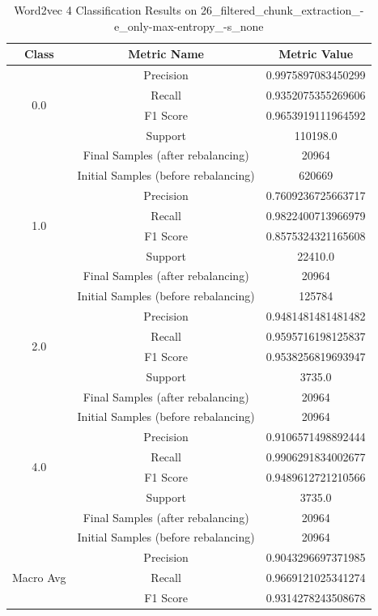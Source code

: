 \begin{longtable}{|c|c|c|}
\caption{Word2vec 4 Classification Results on 26\_filtered\_chunk\_extraction\_-e\_only-max-entropy\_-s\_none} \label{tab:26_filtered_chunk_extraction_-e_only-max-entropy_-s_none_word2vec_4_classifiers_results} \\
\hline
Class & Metric Name & Metric Value \\
\hline
\multirow{4}{*}{0.0} & Precision & 0.9975897083450299 \\
 & Recall & 0.9352075355269606 \\
 & F1 Score & 0.9653919111964592 \\
 & Support & 110198.0 \\
 & Final Samples (after rebalancing) & 20964 \\
 & Initial Samples (before rebalancing) & 620669 \\
\hline
\multirow{4}{*}{1.0} & Precision & 0.7609236725663717 \\
 & Recall & 0.9822400713966979 \\
 & F1 Score & 0.8575324321165608 \\
 & Support & 22410.0 \\
 & Final Samples (after rebalancing) & 20964 \\
 & Initial Samples (before rebalancing) & 125784 \\
\hline
\multirow{4}{*}{2.0} & Precision & 0.9481481481481482 \\
 & Recall & 0.9595716198125837 \\
 & F1 Score & 0.9538256819693947 \\
 & Support & 3735.0 \\
 & Final Samples (after rebalancing) & 20964 \\
 & Initial Samples (before rebalancing) & 20964 \\
\hline
\multirow{4}{*}{4.0} & Precision & 0.9106571498892444 \\
 & Recall & 0.9906291834002677 \\
 & F1 Score & 0.9489612721210566 \\
 & Support & 3735.0 \\
 & Final Samples (after rebalancing) & 20964 \\
 & Initial Samples (before rebalancing) & 20964 \\
\hline
\multirow{4}{*}{Macro Avg} & Precision & 0.9043296697371985 \\
 & Recall & 0.9669121025341274 \\
 & F1 Score & 0.9314278243508678 \\

\end{longtable}
